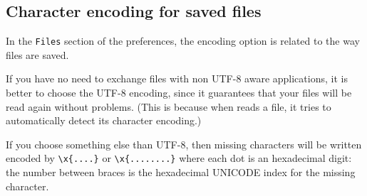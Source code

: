 
\subsection{Character encoding for saved files}
\label{sec:coqidecharencoding}

In the \texttt{Files} section of the preferences, the encoding option
is related to the way files are saved. 

If you have no need to exchange files with non UTF-8 aware
applications, it is better to choose the UTF-8 encoding, since it
guarantees that your files will be read again without problems. (This
is because when \CoqIDE{} reads a file, it tries to automatically
detect its character encoding.) 

If you choose something else than UTF-8, then missing characters will
be written encoded by \verb|\x{....}| or \verb|\x{........}| where
each dot is an hexadecimal digit: the number between braces is the
hexadecimal UNICODE index for the missing character.


